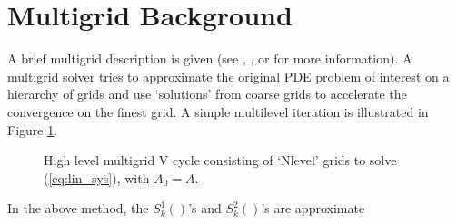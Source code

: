 \documentclass{article}[11pt]
\begin{document}

\section{Multigrid Background} \label{multigrid}
A brief multigrid description is given (see
\cite{brandt.classic}, \cite{hack.book}, or \cite{hack2.book}
 for more information).
A multigrid solver tries to approximate
the original PDE problem of interest on a hierarchy of grids and use
`solutions' from coarse grids to accelerate the convergence
on the finest grid.  A simple multilevel iteration is illustrated in
Figure \ref{multigrid code}.
%
\begin{figure}[htp]
\caption{High level multigrid V cycle consisting of `Nlevel' grids to
  solve (\ref{eq:lin_sys}), with $A_0 = A$.
\label{multigrid code} }
\end{figure}
%
In the above method, the $S^{1}_k()$'s and $S^{2}_k()$'s are approximate
\end{document}
